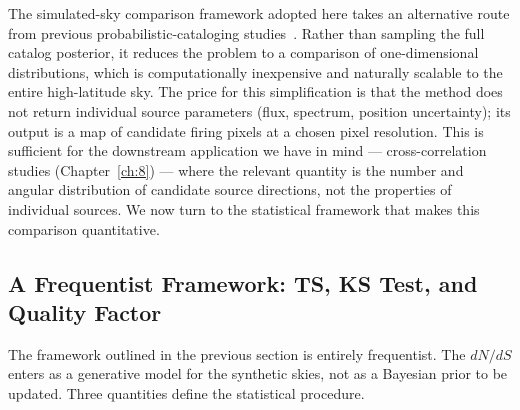 
The simulated-sky comparison framework adopted here takes an alternative route from previous probabilistic-cataloging studies~\cite{Daylan:2016tia,Bhat:2022}.
Rather than sampling the full catalog posterior, it reduces the problem to a comparison of one-dimensional \TS distributions, which is computationally inexpensive and naturally scalable to the entire high-latitude sky.
The price for this simplification is that the method does not return individual source parameters (flux, spectrum, position uncertainty); its output is a map of candidate firing pixels at a chosen pixel resolution.
This is sufficient for the downstream application we have in mind --- cross-correlation studies (Chapter~\ref{ch:8}) --- where the relevant quantity is the number and angular distribution of candidate source directions, not the properties of individual sources.
We now turn to the statistical framework that makes this comparison quantitative.

\subsection{A Frequentist Framework: TS, KS Test, and Quality Factor}
\label{sec:frequentist_framework}

The framework outlined in the previous section is entirely frequentist.
The $dN/dS$ enters as a generative model for the synthetic skies, not as a Bayesian prior to be updated.
Three quantities define the statistical procedure.

